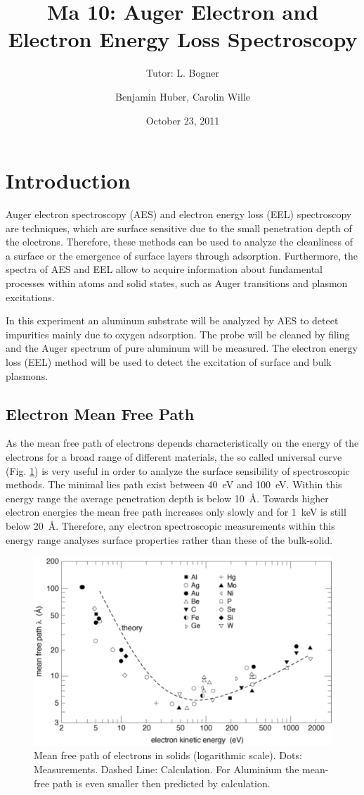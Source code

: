 \documentclass[a4paper]{scrartcl}
\title{Ma 10: Auger Electron and Electron Energy Loss Spectroscopy}
\subtitle{Tutor: L. Bogner}
\author{Benjamin Huber, Carolin Wille}
\date{October 23, 2011}
\numberwithin{equation}{section}
\numberwithin{figure}{section}
\numberwithin{table}{section}
\begin{document}
\thispagestyle{empty}
\maketitle
\tableofcontents
\clearpage



\section{Introduction}
Auger electron spectroscopy (AES) and electron energy loss (EEL) spectroscopy are techniques, which are surface sensitive due to the small penetration depth of the electrons. Therefore, these methods can be used to analyze the cleanliness of a surface or the emergence of surface layers through adsorption. Furthermore, the spectra of AES and EEL allow to acquire information about fundamental processes within atoms and solid states, such as Auger transitions and plasmon excitations.  

In this experiment an aluminum substrate will be analyzed by AES to detect impurities mainly due to oxygen adsorption. The probe will be cleaned by filing and the Auger spectrum of pure aluminum will be measured. The electron energy loss (EEL) method will be used to detect the excitation of surface and bulk plasmons.


\subsection{Electron Mean Free Path}
As the mean free path of electrons depends characteristically on the energy of the electrons for a broad range of different materials, the so called universal curve (Fig. \ref{mf}) is very useful in order to analyze the surface sensibility of spectroscopic methods. The minimal lies path exist between \SI{40}{eV} and \SI{100}{eV}. Within this energy range the average penetration depth is below \SI{10}{\AA}. Towards higher electron energies the mean free path increases only slowly and for \SI{1}{keV} is still below \SI{20}{\AA}. Therefore, any electron spectroscopic measurements within this energy range analyses surface properties rather than these of the bulk-solid. 
\begin{figure}[htbp]
\centering
\includegraphics[width=0.5 \textwidth]{meanfree.pdf}
\caption{\small Mean free path of electrons in solids (logarithmic scale). Dots: Measurements. Dashed Line: Calculation. For Aluminium the mean-free path is even smaller then predicted by calculation. \cite{zangwill} }
\label{mf}
\end{figure}
\end{document}

